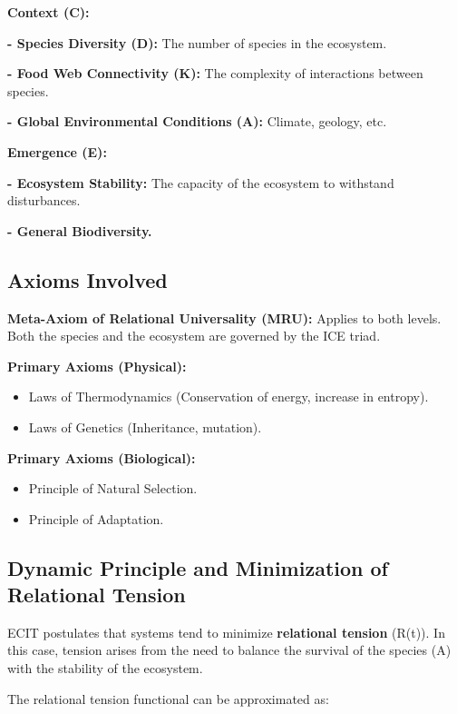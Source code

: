 \documentclass{article}
\begin{document}
\bigskip
\noindent\textbf{Context (C):}\par
\textbf{- Species Diversity (D):} The number of species in the ecosystem.\par
\textbf{- Food Web Connectivity (K):} The complexity of interactions between species.\par
\textbf{- Global Environmental Conditions (A):} Climate, geology, etc.\par

\bigskip
\noindent\textbf{Emergence (E):}\par
 \textbf{- Ecosystem Stability:} The capacity of the ecosystem to withstand disturbances.\par
 \textbf{- General Biodiversity.}\par

\subsection{Axioms Involved}

\noindent\textbf{Meta-Axiom of Relational Universality (MRU):} Applies to both levels. Both the species and the ecosystem are governed by the ICE triad.\par
\noindent\textbf{Primary Axioms (Physical):}
\begin{itemize}
\item Laws of Thermodynamics (Conservation of energy, increase in entropy).
\item Laws of Genetics (Inheritance, mutation).
\end{itemize}

\noindent\textbf{Primary Axioms (Biological):}
\begin{itemize}
\item Principle of Natural Selection.
\item Principle of Adaptation.
\end{itemize}

\subsection{Dynamic Principle and Minimization of Relational Tension}

ECIT postulates that systems tend to minimize \textbf{relational tension} (R(t)). In this case, tension arises from the need to balance the survival of the species (A) with the stability of the ecosystem.

The relational tension functional can be approximated as:
\end{document}
